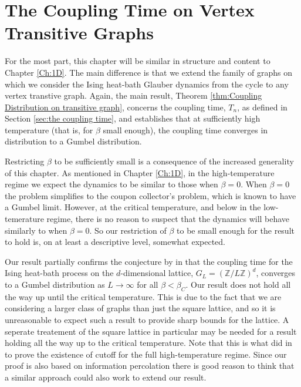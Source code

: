 \chapter{The Coupling Time on Vertex Transitive Graphs}
\label{Ch:GeneralResults}


For the most part, this chapter will be similar in structure and content to Chapter \ref{Ch:1D}. The main difference is that we extend the family of graphs on which we consider the Ising heat-bath Glauber dynamics from the cycle to any vertex transtive graph. Again, the main result, Theorem \ref{thm:Coupling Distribution on transitive graph}, concerns the coupling time, $T_n$, as defined in Section \ref{sec:the coupling time}, and establishes that at sufficiently high temperature (that is, for $\beta$ small enough), the coupling time converges in distribution to a Gumbel distribution.

Restricting $\beta$ to be sufficiently small is a consequence of the increased generality of this chapter. As mentioned in Chapter \ref{Ch:1D}, in the high-temperature regime we expect the dynamics to be similar to those when $\beta = 0$. When $\beta = 0$ the problem simplifies to the coupon collector's problem, which is known to have a Gumbel limit. However, at the critical temperature, and below in the low-temerature regime, there is no reason to suspect that the dynamics will behave similarly to when $\beta = 0$. So our restriction of $\beta$ to be small enough for the result to hold is, on at least a descriptive level, somewhat expected. 

Our result partially confirms the conjecture by \citeauthor{Collevecchio2017-nq} in \cite{Collevecchio2017-nq} that the coupling time for the Ising heat-bath process on the $d$-dimensional lattice, $G_L = (\mathbb{Z}/L\mathbb{Z})^d$, converges to a Gumbel distribution as $L \rightarrow\infty$ for all $\beta < \beta_C$. Our result does not hold all the way up until the critical temperature. This is due to the fact that we are considering a larger class of graphs than just the square lattice, and so it is unreasonable to expect such a result to provide sharp bounds for the lattice. A seperate treatement of the square lattice in particular may be needed for a result holding all the way up to the critical temperature. Note that this is what \citeauthor{Lubetzky2013-yv} did in \cite{Lubetzky2013-yv} to prove the existence of cutoff for the full high-temperature regime. Since our proof is also based on information percolation there is good reason to think that a similar approach could also work to extend our result.

